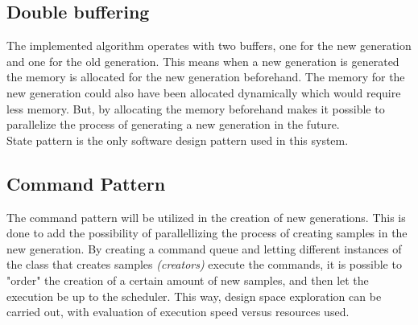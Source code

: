 \subsection{Double buffering}
The implemented algorithm operates with two buffers, one for the new generation and one for the old generation. This means when a new generation is generated the memory is allocated for the new generation beforehand. The memory for the new generation could also have been allocated dynamically which would require less memory. But, by allocating the memory beforehand makes it possible to parallelize the process of generating a new generation in the future.\\   
State pattern is the only software design pattern used in this system. 

\subsection{Command Pattern}
The command pattern will be utilized in the creation of new generations. This is done to add the possibility of parallellizing the process of creating samples in the new generation. By creating a command queue and letting different instances of the class that creates samples \textit{(creators)} execute the commands, it is possible to "order" the creation of a certain amount of new samples, and then let the execution be up to the scheduler. This way, design space exploration can be carried out, with evaluation of execution speed versus resources used.